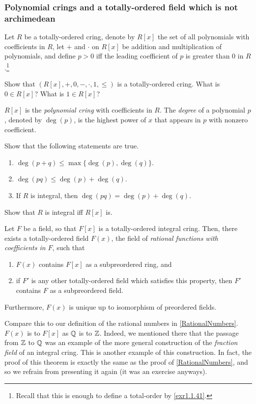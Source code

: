 \subsubsection{Polynomial crings and a totally-ordered field which is not archimedean}

\begin{dfn}
Let $R$ be a totally-ordered cring, denote by $R[x]$ the set of all polynomials with coefficients in $R$, let $+$ and $\cdot$ on $R[x]$ be addition and multiplication of polynomials, and define $p>0$ iff the leading coefficient of $p$ is greater than $0$ in $R$.\footnote{Recall that this is enough to define a total-order by \cref{exr1.1.41}.} 
\begin{exr}
Show that $\left( R[x],+,0,-,\cdot ,1,\leq \right)$ is a totally-ordered cring.  What is $0\in R[x]$?  What is $1\in R[x]$?
\end{exr}
\noindent
$R[x]$ is the \emph{polynomial cring} with coefficients in $R$.  The \emph{degree} of a polynomial $p$, denoted by $\deg (p)$, is the highest power of $x$ that appears in $p$ with nonzero coefficient.
\end{dfn}
\begin{exr}
Show that the following statements are true.
\begin{enumerate}
\item $\deg (p+q)\leq \max \{ \deg (p),\deg (q)\}$.
\item $\deg (pq)\leq \deg (p)+\deg (q)$.
\item If $R$ is integral, then $\deg (pq)=\deg (p)+\deg (q)$.
\end{enumerate}
\end{exr}
\begin{exr}
Show that $R$ is integral iff $R[x]$ is.
\end{exr}
\begin{thm}
Let $F$ be a field, so that $F[x]$ is a totally-ordered integral cring.  Then, there exists a totally-ordered field $F(x)$, the field of \emph{rational functions with coefficients in $F$}, such that
\begin{enumerate}
\item $F(x)$ contains $F[x]$ as a subpreordered ring, and
\item if $F'$ is any other totally-ordered field which satisfies this property, then $F'$ contains $F$ as a subpreordered field.
\end{enumerate}
Furthermore, $F(x)$ is unique up to isomorphism of preordered fields.
\begin{rmk}
Compare this to our definition of the rational numbers in \cref{RationalNumbers}.  $F(x)$ is to $F[x]$ as $\mathbb{Q}$ is to $\mathbb{Z}$.  Indeed, we mentioned there that the passage from $\mathbb{Z}$ to $\mathbb{Q}$ was an example of the more general construction of the \emph{fraction field} of an integral cring.  This is another example of this construction.  In fact, the proof of this theorem is exactly the same as the proof of \cref{RationalNumbers}, and so we refrain from presenting it again (it was an exercise anyways).
\end{rmk}
\end{thm}
